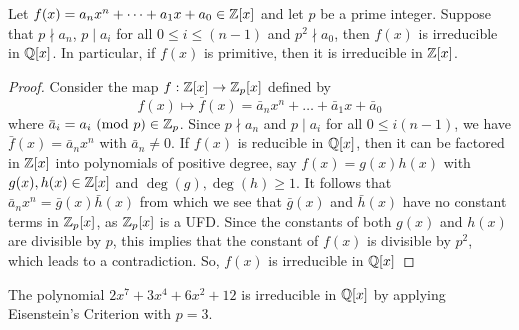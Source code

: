 \documentclass[11pt]{article}
\newcommand{\Mod}[1]{\ (\mathrm{mod}\ #1)}
\begin{document}
\begin{theorem} \label{eisenstien}
Let $f(x) = a_nx^n + \dots + a_1x + a_0 \in \mathbb{Z}[x]$ and let $p$ be a prime
integer. Suppose that $p \nmid a_n$, $p \mid a_i$ for all $0 \leq i \leq (n-1)$
and $p^2 \nmid a_0$, then $f(x)$ is irreducible in $\mathbb{Q}[x]$. In particular, if
$f(x)$ is primitive, then it is irreducible in $\mathbb{Z}[x]$.
\end{theorem}
\begin{proof}
Consider the map $f: \mathbb{Z}[x] \to \mathbb{Z}_p[x]$ defined by
\begin{equation*}
f(x) \mapsto \bar f(x) = \bar a_nx^n + \dots + \bar a_1x + \bar a_0
\end{equation*}
where $\bar a_i = a_i \Mod{p} \in \Z_p$. Since $p \nmid a_n$ and $p \mid a_i$
for all $0 \leq i (n-1)$, we have $\bar f(x) = \bar a_nx^n$ with $\bar a_n \neq
0$. If $f(x)$ is reducible in $\mathbb{Q}[x]$, then it can be factored in $\mathbb{Z}[x]$ into
polynomials of positive degree, say $f(x) = g(x)h(x)$ with $g(x), h(x) \in
\mathbb{Z}[x]$ and $\deg(g), \deg(h) \geq 1$. It follows that $\bar a_nx^n = \bar
g(x) \bar h(x)$ from which we see that $\bar g(x)$ and $\bar h(x)$ have no
constant terms in $\mathbb{Z}_p[x]$, as $\mathbb{Z}_p[x]$ is a UFD\@. Since the constants of
both $g(x)$
and $h(x)$ are divisible by $p$, this implies that the constant of $f(x)$ is
divisible by $p^{2}$, which leads to a contradiction. So, $f(x)$ is irreducible
in $\mathbb{Q}[x]$
\end{proof}
\begin{example}
The polynomial $2x^7 + 3x^4 + 6x^2 + 12$ is irreducible in $\mathbb{Q}[x]$ by applying
Eisenstein's Criterion with $p=3$.
\end{example}
\end{document}
